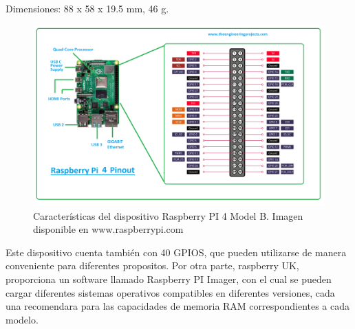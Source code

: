 \documentclass[12pt]{book} %
\begin{document}
Dimensiones: 88 x 58 x 19.5 mm, 46 g.\\
\begin{figure}[H]
	\begin{center}
	\includegraphics[scale = 0.4]{raspberry-pi-4.jpg}
	\caption{Características del dispositivo Raspberry PI 4 Model B. Imagen disponible en www.raspberrypi.com} 
	\end{center}
	\end{figure}

Este dispositivo cuenta también con 40 GPIOS, que pueden utilizarse de manera conveniente para diferentes propositos. Por otra parte, raspberry UK, proporciona un software llamado Raspberry PI Imager, con el cual se pueden cargar diferentes sistemas operativos compatibles en diferentes versiones, cada una recomendara para las capacidades de memoria RAM correspondientes a cada modelo.
\end{document}
